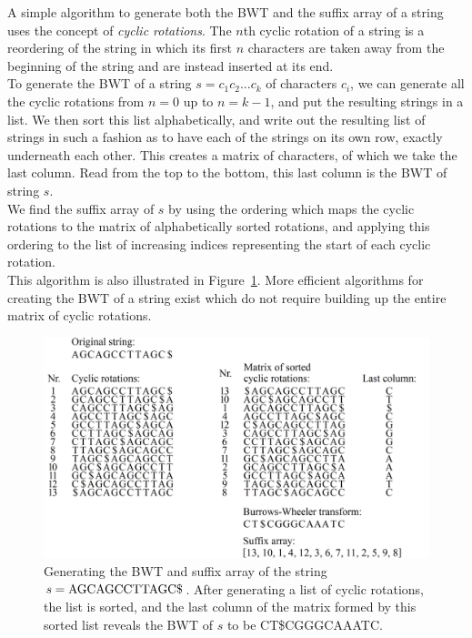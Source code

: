 \documentclass[a4paper,12pt,twoside,BCOR=10mm]{scrbook}
\begin{document}
A simple algorithm to generate both the BWT and the suffix array of a string uses
the concept of \textit{cyclic rotations}.
The $ n $th cyclic rotation of a string is a reordering of the string in which its first $ n $ characters
are taken away from the beginning of the string and are instead inserted at its end. \\
To generate the BWT of a string $ s = c_1 c_2 ... c_k $ of characters $ c_i $,
we can generate all the cyclic rotations from $ n = 0 $ up to $ n = k - 1 $, and
put the resulting strings in a list.
We then sort this list alphabetically, and write out the resulting list of strings
in such a fashion as to have each of the strings on its own row, exactly underneath each other.
This creates a matrix of characters, of which we take the last column.
Read from the top to the bottom, this last column is the BWT of string $ s $. \\
We find the suffix array of $ s $ by using the ordering which maps
the cyclic rotations to the matrix of alphabetically sorted rotations,
and applying this ordering to the list of increasing indices representing
the start of each cyclic rotation. \\
This algorithm is also illustrated in Figure~\ref{fig:evo_fig_bwt_with_cyclic_rotations}.
More efficient algorithms for creating the BWT of a string exist
which do not require building up the entire matrix of cyclic rotations.

\begin{figure}[!htb]
\centering
\includegraphics[width=\textwidth]{evo_fig_bwt_with_cyclic_rotations.png}
\caption[Generating the BWT and suffix array of a string]{Generating the BWT and suffix array of the string $ s = \textup{AGCAGCCTTAGC\$} $. After generating a list of cyclic rotations, the list is sorted, and the last column of the matrix formed by this sorted list reveals the BWT of $ s $ to be \textup{CT\$CGGGCAAATC}.} \label{fig:evo_fig_bwt_with_cyclic_rotations}
\end{figure}
\end{document}
